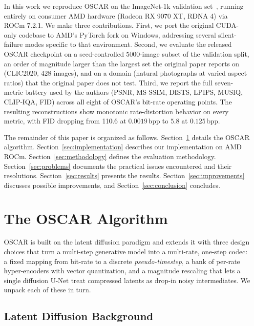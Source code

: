 \documentclass[conference]{IEEEtran}
\begin{document}
In this work we reproduce OSCAR on the ImageNet-1k validation set~\cite{imagenet},
running entirely on consumer AMD hardware (Radeon RX 9070 XT, RDNA 4) via
ROCm 7.2.1. We make three contributions. First, we port the original
CUDA-only codebase to AMD's PyTorch fork on Windows, addressing several
silent-failure modes specific to that environment. Second, we evaluate the
released OSCAR checkpoint on a seed-controlled 5000-image subset of the
validation split, an order of magnitude larger than the largest set the
original paper reports on (CLIC2020, 428 images), and on a domain (natural
photographs at varied aspect ratios) that the original paper does not test.
Third, we report the full seven-metric battery used by the authors (PSNR,
MS-SSIM, DISTS, LPIPS, MUSIQ, CLIP-IQA, FID) across all eight of OSCAR's
bit-rate operating points. The resulting reconstructions show monotonic
rate-distortion behavior on every metric, with FID dropping from 110.6 at
$0.0019$\,bpp to $5.8$ at $0.125$\,bpp.

The remainder of this paper is organized as follows.
Section~\ref{sec:algorithm} details the OSCAR algorithm.
Section~\ref{sec:implementation} describes our implementation on AMD ROCm.
Section~\ref{sec:methodology} defines the evaluation methodology.
Section~\ref{sec:problems} documents the practical issues encountered and their
resolutions. Section~\ref{sec:results} presents the results.
Section~\ref{sec:improvements} discusses possible improvements, and
Section~\ref{sec:conclusion} concludes.

\section{The OSCAR Algorithm}
\label{sec:algorithm}

OSCAR is built on the latent diffusion paradigm and extends it with three
design choices that turn a multi-step generative model into a multi-rate,
one-step codec: a fixed mapping from bit-rate to a discrete \emph{pseudo-timestep},
a bank of per-rate hyper-encoders with vector quantization, and a magnitude
rescaling that lets a single diffusion U-Net treat compressed latents as drop-in
noisy intermediates. We unpack each of these in turn.

\subsection{Latent Diffusion Background}
\end{document}

